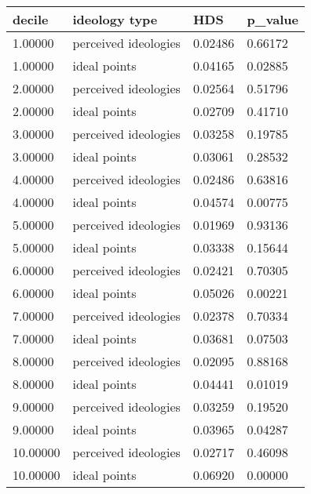 \begin{table}
\centering
\begin{tabular}[t]{llll}
\toprule
decile & ideology type & HDS & p\_value\\
\midrule
1.00000 & perceived ideologies & 0.02486 & 0.66172\\
1.00000 & ideal points & 0.04165 & 0.02885\\
2.00000 & perceived ideologies & 0.02564 & 0.51796\\
2.00000 & ideal points & 0.02709 & 0.41710\\
3.00000 & perceived ideologies & 0.03258 & 0.19785\\
3.00000 & ideal points & 0.03061 & 0.28532\\
4.00000 & perceived ideologies & 0.02486 & 0.63816\\
4.00000 & ideal points & 0.04574 & 0.00775\\
5.00000 & perceived ideologies & 0.01969 & 0.93136\\
5.00000 & ideal points & 0.03338 & 0.15644\\
6.00000 & perceived ideologies & 0.02421 & 0.70305\\
6.00000 & ideal points & 0.05026 & 0.00221\\
7.00000 & perceived ideologies & 0.02378 & 0.70334\\
7.00000 & ideal points & 0.03681 & 0.07503\\
8.00000 & perceived ideologies & 0.02095 & 0.88168\\
8.00000 & ideal points & 0.04441 & 0.01019\\
9.00000 & perceived ideologies & 0.03259 & 0.19520\\
9.00000 & ideal points & 0.03965 & 0.04287\\
10.00000 & perceived ideologies & 0.02717 & 0.46098\\
10.00000 & ideal points & 0.06920 & 0.00000\\
\bottomrule
\end{tabular}
\end{table}
